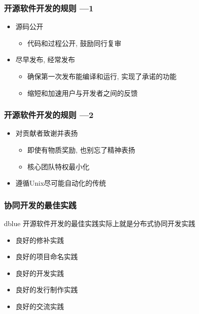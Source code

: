 \documentclass[compress]{beamer}
\newenvironment{pblock}{\begin{beamercolorbox}[rounded=true,
      shadow=true]{dblue}}{\end{beamercolorbox}}
\begin{document}
\begin{frame}
\frametitle{开源软件开发的规则 ---1}
\begin{itemize}
\item 源码公开
    \begin{itemize}
    \item 代码和过程公开, 鼓励同行复审
    \end{itemize}
\item 尽早发布, 经常发布
    \begin{itemize}
    \item 确保第一次发布能编译和运行, 实现了承诺的功能
    \item 缩短和加速用户与开发者之间的反馈
    \end{itemize}
\end{itemize}


\end{frame}
\begin{frame}

\frametitle{开源软件开发的规则 ---2}
\begin{itemize}
\item 对贡献者致谢并表扬
    \begin{itemize}
    \item 即使有物质奖励, 也别忘了精神表扬
    \item 核心团队特权最小化
    \end{itemize}
\item 遵循Unix尽可能自动化的传统
\end{itemize}


\end{frame}

\begin{frame}
\frametitle{协同开发的最佳实践}
\begin{pblock}
开源软件开发的最佳实践实际上就是分布式协同开发实践
\end{pblock}
\begin{itemize}
\item 良好的修补实践
\item 良好的项目命名实践
\item 良好的开发实践
\item 良好的发行制作实践
\item 良好的交流实践
\end{itemize}

\end{frame}
\end{document}
